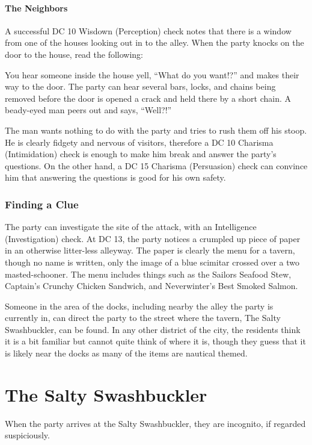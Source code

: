 \documentclass[10pt,twocolumn,openany,nodeprecatedcode,bg=none,inline]{dndbook}
\begin{document}
\paragraph{The Neighbors}
A successful DC 10 Wisdown (Perception) check notes that there is a window from one of the houses looking out in to the alley.
When the party knocks on the door to the house, read the following:

\begin{DndReadAloud}
  You hear someone inside the house yell, ``What do you want!?'' and makes their way to the door.
  The party can hear several bars, locks, and chains being removed before the door is opened a crack and held there by a short chain.
  A beady-eyed man peers out and says, ``Well?!''
\end{DndReadAloud}

The man wants nothing to do with the party and tries to rush them off his stoop.
He is clearly fidgety and nervous of visitors, therefore a DC 10 Charisma (Intimidation) check is enough to make him break and answer the party's questions.
On the other hand, a DC 15 Charisma (Persuasion) check can convince him that answering the questions is good for his own safety.

\subsubsection{Finding a Clue}
\label{sec:clue}
The party can investigate the site of the attack, with an Intelligence (Investigation) check.
At DC 13, the party notices a crumpled up piece of paper in an otherwise litter-less alleyway.
The paper is clearly the menu for a tavern, though no name is written, only the image of a blue scimitar crossed over a two masted-schooner.
The menu includes things such as the Sailors Seafood Stew, Captain's Crunchy Chicken Sandwich, and Neverwinter's Best Smoked Salmon.

Someone in the area of the docks, including nearby the alley the party is currently in, can direct the party to the street where the tavern, The Salty Swashbuckler, can be found.
In any other district of the city, the residents think it is a bit familiar but cannot quite think of where it is, though they guess that it is likely near the docks as many of the items are nautical themed.

\section{The Salty Swashbuckler}
When the party arrives at the Salty Swashbuckler, they are incognito, if regarded suspiciously.
\end{document}
